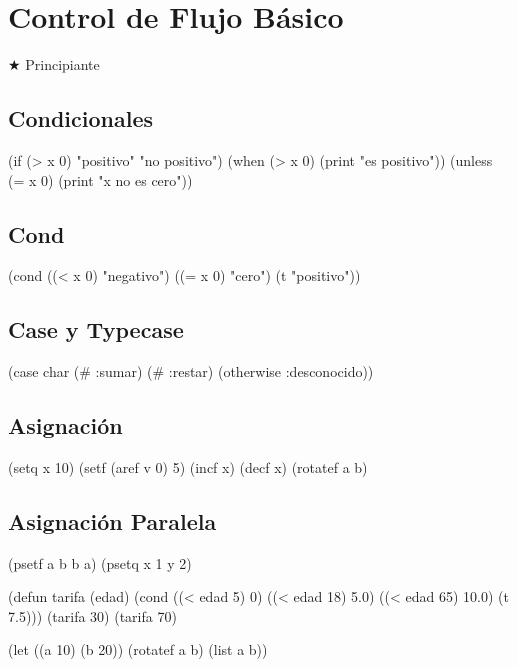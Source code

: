 \chapter{Control de Flujo Básico}
\label{chap:control}
{\huge$\bigstar$} Principiante

\section{Condicionales}
\begin{lispcode}
(if (> x 0) "positivo" "no positivo")
(when (> x 0) (print "es positivo"))
(unless (= x 0) (print "x no es cero"))
\end{lispcode}

\section{Cond}
\begin{lispcode}
(cond ((< x 0) "negativo") ((= x 0) "cero") (t "positivo"))
\end{lispcode}

\section{Case y Typecase}
\begin{lispcode}
(case char (#\+ :sumar) (#\- :restar) (otherwise :desconocido))
\end{lispcode}

\section{Asignación}
\begin{lispcode}
(setq x 10)
(setf (aref v 0) 5)
(incf x) (decf x)
(rotatef a b)
\end{lispcode}

\section{Asignación Paralela}
\begin{lispcode}
(psetf a b b a)
(psetq x 1 y 2)
\end{lispcode}

\begin{examplebox}[title=Calculadora de tarifas con cond]
\begin{lispcode}
(defun tarifa (edad)
  (cond ((< edad 5) 0) ((< edad 18) 5.0) ((< edad 65) 10.0) (t 7.5)))
(tarifa 30) (tarifa 70)
\end{lispcode}
\end{examplebox}

\begin{examplebox}[title=Intercambio con rotatef]
\begin{lispcode}
(let ((a 10) (b 20)) (rotatef a b) (list a b))
\end{lispcode}
\end{examplebox}

